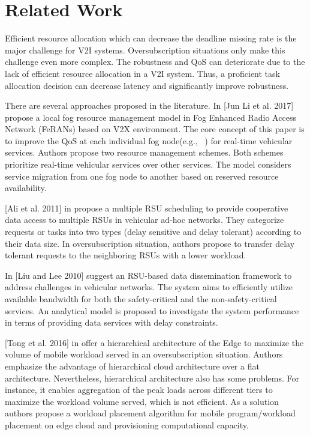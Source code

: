 \section{Related Work}\label{relatedwork}
Efficient resource allocation which can decrease the deadline missing rate is the major challenge for V2I systems. Oversubscription situations only make this challenge even more complex. The robustness and QoS can deteriorate due to the lack of efficient resource allocation in a V2I system. Thus, a proficient task allocation decision can decrease latency and significantly improve robustness.  


There are several approaches proposed in the literature. In \cite{li2017resource} [Jun Li et al. 2017] propose a local fog resource management model in Fog Enhanced Radio Access Network (FeRANs) based on V2X environment. The core concept of this paper is to improve the QoS at each individual fog node(e.g., \bs~) for real-time vehicular services. Authors propose two resource management schemes. Both schemes prioritize real-time vehicular services over other services. The model considers service migration from one fog node to another based on reserved resource availability.


[Ali et al. 2011] in \cite{ali2011co} propose a multiple RSU scheduling to provide cooperative data access to multiple RSUs in vehicular ad-hoc networks. They categorize requests or tasks into two types (delay sensitive and delay tolerant) according to their data size.  In oversubscription situation, authors propose to transfer delay tolerant requests to the neighboring RSUs with a lower workload.    
 
In \cite{liu2010rsu}  [Liu and Lee 2010] suggest an RSU-based data dissemination framework to address challenges in vehicular networks. The system aims to efficiently utilize available bandwidth for both the safety-critical and the non-safety-critical services. An analytical model is proposed to investigate the system performance in terms of providing data services with delay constraints.

[Tong et al. 2016] in \cite{tong2016hierarchical} offer a hierarchical architecture of the Edge to maximize the volume of mobile workload served in an oversubscription situation. Authors emphasize the advantage of hierarchical cloud architecture over a flat architecture. Nevertheless, hierarchical architecture also has some problems. For instance, it enables aggregation of the peak loads across different tiers to maximize the workload volume served, which is not efficient. As a solution authors propose a workload placement algorithm for mobile program/workload placement on edge cloud and provisioning computational capacity. 

